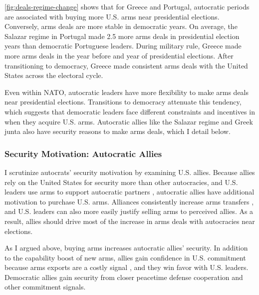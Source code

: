 \documentclass[12pt]{article}
\begin{document}
\autoref{fig:deals-regime-change} shows that for Greece and Portugal, autocratic periods are associated with buying more U.S. arms near presidential elections.
Conversely, arms deals are more stable in democratic years. 
On average, the Salazar regime in Portugal made 2.5 more arms deals in presidential election years than democratic Portuguese leaders.
During military rule, Greece made more arms deals in the year before and year of presidential elections.
After transitioning to democracy, Greece made consistent arms deals with the United States across the electoral cycle.


Even within NATO, autocratic leaders have more flexibility to make arms deals near presidential elections. 
Transitions to democracy attenuate this tendency, which suggests that democratic leaders face different constraints and incentives in when they acquire U.S. arms. 
Autocratic allies like the Salazar regime and Greek junta also have security reasons to make arms deals, which I detail below. 



\subsubsection{Security Motivation: Autocratic Allies}


I scrutinize autocrats' security motivation by examining U.S. allies. 
Because allies rely on the United States for security more than other autocracies, and U.S. leaders use arms to support autocratic partners \citep{Yarhi-Miloetal2016}, autocratic allies have additional motivation to purchase U.S. arms. 
Alliances consistently increase arms transfers \citep{Thurneretal2019}, and U.S. leaders can also more easily justify selling arms to perceived allies. 
As a result, allies should drive most of the increase in arms deals with autocracies near elections. 




As I argued above, buying arms increases autocratic allies' security.
In addition to the capability boost of new arms, allies gain confidence in U.S. commitment because arms exports are a costly signal \citep{McManusYarhi-Milo2017}, and they win favor with U.S. leaders. 
Democratic allies gain security from closer peacetime defense cooperation and other commitment signals.
\end{document}

